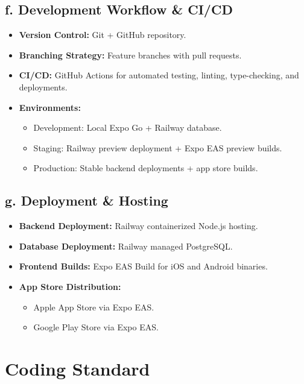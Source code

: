\documentclass{article}
\begin{document}
\subsection*{f. Development Workflow \& CI/CD}
\begin{itemize}
    \item \textbf{Version Control:} Git + GitHub repository.
    \item \textbf{Branching Strategy:} Feature branches with pull requests.
    \item \textbf{CI/CD:} GitHub Actions for automated testing, linting, type-checking, and deployments.
    \item \textbf{Environments:}
    \begin{itemize}
        \item Development: Local Expo Go + Railway database.
        \item Staging: Railway preview deployment + Expo EAS preview builds.
        \item Production: Stable backend deployments + app store builds.
    \end{itemize}
\end{itemize}

\subsection*{g. Deployment \& Hosting}
\begin{itemize}
    \item \textbf{Backend Deployment:} Railway containerized Node.js hosting.
    \item \textbf{Database Deployment:} Railway managed PostgreSQL.
    \item \textbf{Frontend Builds:} Expo EAS Build for iOS and Android binaries.
    \item \textbf{App Store Distribution:}
    \begin{itemize}
        \item Apple App Store via Expo EAS.
        \item Google Play Store via Expo EAS.
    \end{itemize}
\end{itemize}


\section{Coding Standard}

\end{document}
